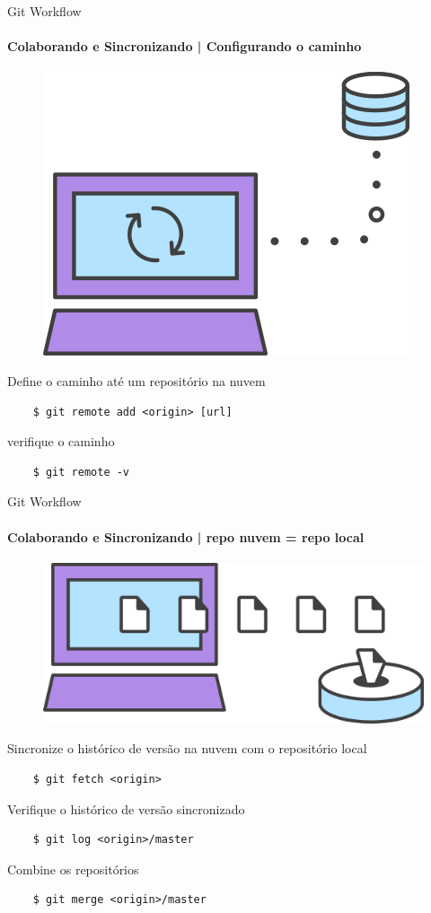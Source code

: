 \documentclass[xcolor=dvipsnames,t]{beamer}
\begin{document}
\begin{frame}[fragile]{Git Workflow}
\framesubtitle{Colaborando e Sincronizando  | Configurando o caminho }

\begin{figure}
	\centering			
	\includegraphics[width=0.2\linewidth]{figures/gitsync}
\end{figure}

\begin{block}{Define o caminho até um repositório na nuvem}		
	\begin{verbatim}
	$ git remote add <origin> [url]
	\end{verbatim}
\end{block}

\begin{block}{verifique o caminho}		
	\begin{verbatim}	
	$ git remote -v 
	\end{verbatim}
\end{block}

\end{frame}


\begin{frame}[fragile]{Git Workflow}
\framesubtitle{Colaborando e Sincronizando  | repo nuvem = repo local }

\begin{figure}
	\centering			
	\includegraphics[width=0.2\linewidth]{figures/gitclone}
\end{figure}

\begin{block}{Sincronize o histórico de versão na nuvem com o repositório local}		
	\begin{verbatim}
	$ git fetch <origin>
	\end{verbatim}
\end{block}			

\begin{block}{Verifique o histórico de versão sincronizado}		
	\begin{verbatim}	
	$ git log <origin>/master
	\end{verbatim}
\end{block}

\begin{block}{Combine os repositórios}		
	\begin{verbatim}	
	$ git merge <origin>/master
	\end{verbatim}
\end{block}

\end{frame}
\end{document}
